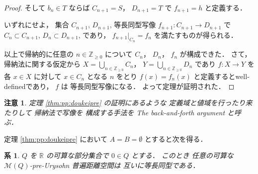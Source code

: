 \documentclass[leqno, 12pt]{jsarticle}
\newtheorem{cor}[thm]{系}
\newtheorem*{rmk}{注意}
\newcommand{\zz}{\mathbb{Z}}
\newcommand{\yozz}[1]{\zz_{\ge #1}}
\newcommand{\rr}{\mathbb{R}}
\newcommand{\Met}[1]{\mathscr{M}(#1)}
\newcommand{\restr}[2]{#1|_{#2}}
\begin{document}
\begin{proof}
そして
$b_{n}\in T$
ならば
$C_{n+1}=S$，
$D_{n+1}=T$
で%
$f_{n+1}=h$
と定義する．

いずれにせよ，
集合
$C_{n+1}$, 
$D_{n+1}$, 
等長同型写像
$f_{n+1}\colon C_{n+1}\to D_{n+1}$
で
$C_{n}\subset C_{n+1}$, 
$D_{n}\subset D_{n+1}$, 
であり，
$\restr{f_{n+1}}{C_{n}}=f_{n}$
を満たすものが得られる．



以上で帰納的に任意の
$n\in \yozz{0}$
について
$C_{n}$，
$D_{n}$，
$f_{n}$
が構成できた．
さて，%
帰納法に関する仮定から
$X=\bigcup_{n\in \yozz{0}}C_{n}$，
$Y=\bigcup_{n\in \yozz{0}}D_{n}$
であり
$f\colon  X\to  Y$
を各
$x\in X$
に対して
$x\in C_{n}$
となる
$n$
をとり
$f(x)=f_{n}(x)$
と定義するとwell-definedであり，
$f$%
は
等長同型写像になる．
よって定理が証明された．
\end{proof}
\begin{rmk}\label{rmk:homogeneity:back-and-forth}
定理
\ref{thm:pp:doukeipre}
の証明にあるような
定義域と値域を行ったり来たりして
帰納法で写像を
構成する手法を
The back-and-forth argument
と呼ぶ．
\end{rmk}

定理 \ref{thm:pp:doukeipre}
において
$A=B=\emptyset$
とすると次を得る．
\begin{cor}\label{cor:pp:doukeipre}
$Q$
を
$\rr$
の可算な部分集合で
$0\in Q$
とする．
このとき
任意の可算な
$\Met{Q}$-pre-Urysohn
普遍距離空間は
互いに等長同型である．
\end{cor}
\end{document}
